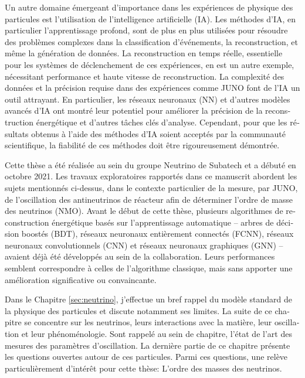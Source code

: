 \documentclass[../main.tex]{subfiles}
\begin{document}
\begin{otherlanguage}{french}
Un autre domaine émergeant d'importance dans les expériences de physique des particules est l'utilisation de l'intelligence artificielle (IA). Les méthodes d'IA, en particulier l'apprentissage profond, sont de plus en plus utilisées pour résoudre des problèmes complexes dans la classification d'événements, la reconstruction, et même la génération de données. La reconstruction en temps réelle, essentielle pour les systèmes de déclenchement de ces expériences, en est un autre exemple, nécessitant performance et haute vitesse de reconstruction. La complexité des données et la précision requise dans des expériences comme JUNO font de l'IA un outil attrayant. En particulier, les réseaux neuronaux (NN) et d'autres modèles avancés d'IA ont montré leur potentiel pour améliorer la précision de la reconstruction énergétique et d'autres tâches clés d'analyse. Cependant, pour que les résultats obtenus à l'aide des méthodes d'IA soient acceptés par la communauté scientifique, la fiabilité de ces méthodes doit être rigoureusement démontrée.

Cette thèse a été réalisée au sein du groupe Neutrino de Subatech et a débuté en octobre 2021. Les travaux exploratoires rapportés dans ce manuscrit abordent les sujets mentionnés ci-dessus, dans le contexte particulier de la mesure, par JUNO, de l'oscillation des antineutrinos de réacteur afin de déterminer l'ordre de masse des neutrinos (NMO).
Avant le début de cette thèse, plusieurs algorithmes de reconstruction énergétique basés sur l'apprentissage automatique -- arbres de décision boostés (BDT), réseaux neuronaux entièrement connectés (FCNN), réseaux neuronaux convolutionnels (CNN) et réseaux neuronaux graphiques (GNN) -- avaient déjà été développés au sein de la collaboration. Leurs performances semblent correspondre à celles de l'algorithme classique, mais sans apporter une amélioration significative ou convaincante.

\hfill

Dans le Chapitre \ref{sec:neutrino}, j'effectue un bref rappel du modèle standard de la physique des particules et discute notamment ses limites. La suite de ce chapitre se concentre sur les neutrinos, leurs interactions avec la matière, leur oscillation et leur phénoménologie. Sont rappelé au sein de chapitre, l'état de l'art des mesures des paramètres d'oscillation. La dernière partie de ce chapitre présente les questions ouvertes autour de ces particules. Parmi ces questions, une relève particulièrement d'intérêt pour cette thèse: L'ordre des masses des neutrinos.



\end{otherlanguage}
\end{document}
